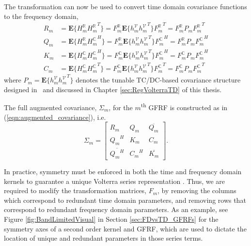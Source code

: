 The transformation can now be used to convert time domain covariance functions to the frequency domain,
\begin{equation}
\begin{split}
R_m &= \textbf{E} \{ H_m^{\mathbb{R}} {H_m^{\mathbb{R}}}^T\} = F_m^{\mathbb{R}} \textbf{E} \{ h_m^{\mathcal{V}} {h_m^{\mathcal{V}}}^T \} {F_m^{\mathbb{R}}}^T = F_m^{\mathbb{R}} P_m {F_m^{\mathbb{R}}}^T \\
Q_m &= \textbf{E} \{ H_m^{\mathbb{R}} {H_m^{\mathbb{C}}}^H\} = F_m^{\mathbb{R}} \textbf{E} \{ h_m^{\mathcal{V}} {h_m^{\mathcal{V}}}^T \} {F_m^{\mathbb{C}}}^H = F_m^{\mathbb{R}} P_m {F_m^{\mathbb{C}}}^H \\
K_m &= \textbf{E} \{ H_m^{\mathbb{C}} {H_m^{\mathbb{C}}}^H\} = F_m^{\mathbb{C}} \textbf{E} \{ h_m^{\mathcal{V}} {h_m^{\mathcal{V}}}^T \} {F_m^{\mathbb{C}}}^H = F_m^{\mathbb{C}} P_m {F_m^{\mathbb{C}}}^H \\
C_m &= \textbf{E} \{ H_m^{\mathbb{C}}{H_m^{\mathbb{C}}}^T\} = F_m^{\mathbb{C}} \textbf{E} \{ h_m^{\mathcal{V}} {h_m^{\mathcal{V}}}^T \} {F_m^{\mathbb{C}}}^T = F_m^{\mathbb{C}} P_m {F_m^{\mathbb{C}}}^T 
\end{split}
\label{eq:CovarianceRelationTransforms_GFRFs}
\end{equation}
where $P_m =  \textbf{E} \{ h_m^{\mathcal{V}} {h_m^{\mathcal{V}}}^T \}$ denotes the tunable TC/DC-based covariance structure designed in~\cite{Birpoutsoukis2017} and discussed in Chapter \ref{sec:RegVolterraTD} of this thesis.

The full augmented covariance, $\Sigma_m$, for the $m$\textsuperscript{th} GFRF is constructed as in (\ref{eqn:augmented_covariance}), i.e.
\begin{equation}
\Sigma_m = \begin{bmatrix}  R_m & Q_m & \overline{Q_m} \\ {Q_m}^H & K_m & C_m \\ \overline{{Q_m}^H} & {C_m}^H & \overline{K_m}\end{bmatrix}. \label{eqn:augmented_covariance_GFRFs}
\end{equation} 

\begin{rem}
In practice, symmetry must be enforced in both the time and frequency domain kernels to guarantee a unique Volterra series representation \cite{Schetzen1980}. Thus, we are required to modify the transformation matrices, $F_m$, by removing the columns which correspond to redundant time domain parameters, and removing rows that correspond to redundant frequency domain parameters. As an example, see Figure \ref{fig:BandLimitedVisual} in Section \ref{sec:FDvsTD_GFRFs} for the symmetry axes of a second order kernel and GFRF, which are used to dictate the location of unique and redundant parameters in those series terms.  
\end{rem}

